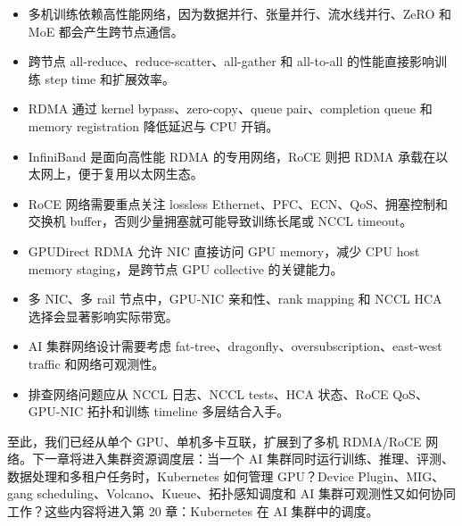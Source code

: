 \begin{itemize}
  \item 多机训练依赖高性能网络，因为数据并行、张量并行、流水线并行、ZeRO 和 MoE 都会产生跨节点通信。
  \item 跨节点 all-reduce、reduce-scatter、all-gather 和 all-to-all 的性能直接影响训练 step time 和扩展效率。
  \item RDMA 通过 kernel bypass、zero-copy、queue pair、completion queue 和 memory registration 降低延迟与 CPU 开销。
  \item InfiniBand 是面向高性能 RDMA 的专用网络，RoCE 则把 RDMA 承载在以太网上，便于复用以太网生态。
  \item RoCE 网络需要重点关注 lossless Ethernet、PFC、ECN、QoS、拥塞控制和交换机 buffer，否则少量拥塞就可能导致训练长尾或 NCCL timeout。
  \item GPUDirect RDMA 允许 NIC 直接访问 GPU memory，减少 CPU host memory staging，是跨节点 GPU collective 的关键能力。
  \item 多 NIC、多 rail 节点中，GPU-NIC 亲和性、rank mapping 和 NCCL HCA 选择会显著影响实际带宽。
  \item AI 集群网络设计需要考虑 fat-tree、dragonfly、oversubscription、east-west traffic 和网络可观测性。
  \item 排查网络问题应从 NCCL 日志、NCCL tests、HCA 状态、RoCE QoS、GPU-NIC 拓扑和训练 timeline 多层结合入手。
\end{itemize}

至此，我们已经从单个 GPU、单机多卡互联，扩展到了多机 RDMA/RoCE 网络。下一章将进入集群资源调度层：当一个 AI 集群同时运行训练、推理、评测、数据处理和多租户任务时，Kubernetes 如何管理 GPU？Device Plugin、MIG、gang scheduling、Volcano、Kueue、拓扑感知调度和 AI 集群可观测性又如何协同工作？这些内容将进入第 20 章：Kubernetes 在 AI 集群中的调度。
